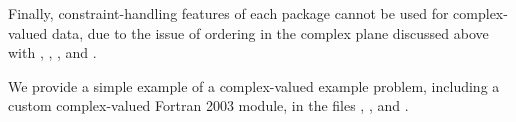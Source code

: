 Finally, constraint-handling features of each package cannot be used
for complex-valued data, due to the issue of 
ordering in the complex plane discussed above with
, , ,
 and .

We provide a simple example of a complex-valued example problem,
including a custom complex-valued Fortran 2003 {\nvector} module, in the
files ,
, and
.
